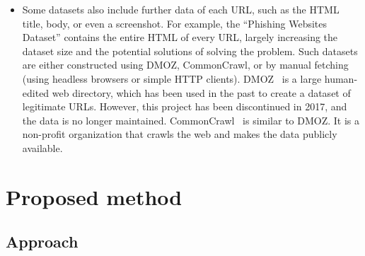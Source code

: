 \documentclass{article}
\begin{document}
\begin{itemize}
        \item Some datasets also include further data of each URL, such as the HTML title, body, or even a screenshot. For example, the ``Phishing Websites Dataset''\cite{VisualizingRNNInURLDetection} contains the entire HTML of every URL, largely increasing the dataset size and the potential solutions of solving the problem. Such datasets are either constructed using DMOZ, CommonCrawl, or by manual fetching (using headless browsers\cite{PhishingLoginURLDetection} or simple HTTP clients). DMOZ~\cite{DMOZ} is a large human-edited web directory, which has been used in the past to create a dataset of legitimate URLs. However, this project has been discontinued in 2017, and the data is no longer maintained. CommonCrawl~\cite{CommonCrawl} is similar to DMOZ. It is a non-profit organization that crawls the web and makes the data publicly available.
    \end{itemize}


%
%
%


    \section{Proposed method}\label{sec:proposed-method}

    \subsection{Approach}\label{subsec:approach}
\end{document}
